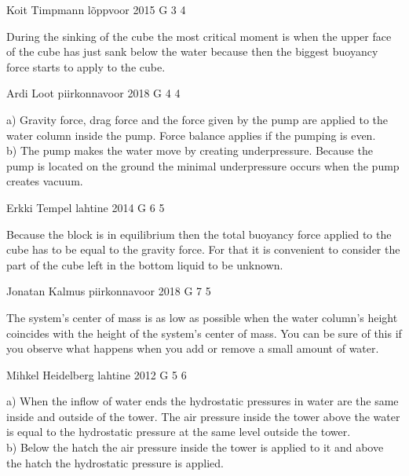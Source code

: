 \documentclass[11pt]{article}
\begin{document}
{Koit Timpmann} %
{lõppvoor} %
{2015} %
{G 3} %
{4} %
{

\ifEngHint
During the sinking of the cube the most critical moment is when the upper face of the cube has just sank below the water because then the biggest buoyancy force starts to apply to the cube.
\fi
}

{Ardi Loot} %
{piirkonnavoor} %
{2018} %
{G 4} %
{4} %
{

\ifEngHint
a) Gravity force, drag force and the force given by the pump are applied to the water column inside the pump. Force balance applies if the pumping is even.\\ 
b) The pump makes the water move by creating underpressure. Because the pump is located on the ground the minimal underpressure occurs when the pump creates vacuum.
\fi
}

{Erkki Tempel} %
{lahtine} %
{2014} %
{G 6} %
{5} %
{

\ifEngHint
Because the block is in equilibrium then the total buoyancy force applied to the cube has to be equal to the gravity force. For that it is convenient to consider the part of the cube left in the bottom liquid to be unknown.
\fi
}

{Jonatan Kalmus} %
{piirkonnavoor} %
{2018} %
{G 7} %
{5} %
{

\ifEngHint
The system’s center of mass is as low as possible when the water column’s height coincides with the height of the system’s center of mass. You can be sure of this if you observe what happens when you add or remove a small amount of water.
\fi
}

{Mihkel Heidelberg} %
{lahtine} %
{2012} %
{G 5} %
{6} %
{

\ifEngHint
a) When the inflow of water ends the hydrostatic pressures in water are the same inside and outside of the tower. The air pressure inside the tower above the water is equal to the hydrostatic pressure at the same level outside the tower.\\
b) Below the hatch the air pressure inside the tower is applied to it and above the hatch the hydrostatic pressure is applied.
\fi
}
\end{document}
